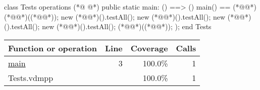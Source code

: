 \begin{vdmpp}
class Tests
  operations
(*@
\label{main:3}
@*)
    public static main: () ==> ()
    main() == (*@\vdmnotcovered{(}@*)
      (*@@*)((*@@*));
      new (*@@*)().testAll();
      new (*@@*)().testAll();
      new (*@@*)().testAll();
      new (*@@*)().testAll();
      (*@@*)((*@@*));
    );
end Tests
\end{vdmpp}
\bigskip
\begin{longtable}{|l|r|r|r|}
\hline
Function or operation & Line & Coverage & Calls \\
\hline
\hline
\hyperref[main:3]{main} & 3&100.0\% & 1 \\
\hline
\hline
Tests.vdmpp & & 100.0\% & 1 \\
\hline
\end{longtable}